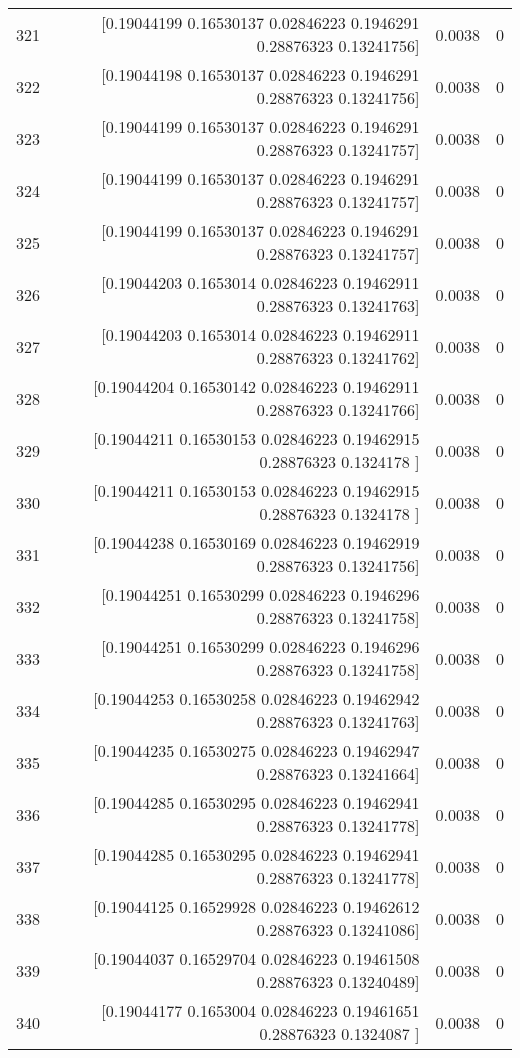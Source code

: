 \begin{longtable}{lrrr}
321 & [0.19044199 0.16530137 0.02846223 0.1946291  0.28876323 0.13241756] & 0.0038 & 0 \\
322 & [0.19044198 0.16530137 0.02846223 0.1946291  0.28876323 0.13241756] & 0.0038 & 0 \\
323 & [0.19044199 0.16530137 0.02846223 0.1946291  0.28876323 0.13241757] & 0.0038 & 0 \\
324 & [0.19044199 0.16530137 0.02846223 0.1946291  0.28876323 0.13241757] & 0.0038 & 0 \\
325 & [0.19044199 0.16530137 0.02846223 0.1946291  0.28876323 0.13241757] & 0.0038 & 0 \\
326 & [0.19044203 0.1653014  0.02846223 0.19462911 0.28876323 0.13241763] & 0.0038 & 0 \\
327 & [0.19044203 0.1653014  0.02846223 0.19462911 0.28876323 0.13241762] & 0.0038 & 0 \\
328 & [0.19044204 0.16530142 0.02846223 0.19462911 0.28876323 0.13241766] & 0.0038 & 0 \\
329 & [0.19044211 0.16530153 0.02846223 0.19462915 0.28876323 0.1324178 ] & 0.0038 & 0 \\
330 & [0.19044211 0.16530153 0.02846223 0.19462915 0.28876323 0.1324178 ] & 0.0038 & 0 \\
331 & [0.19044238 0.16530169 0.02846223 0.19462919 0.28876323 0.13241756] & 0.0038 & 0 \\
332 & [0.19044251 0.16530299 0.02846223 0.1946296  0.28876323 0.13241758] & 0.0038 & 0 \\
333 & [0.19044251 0.16530299 0.02846223 0.1946296  0.28876323 0.13241758] & 0.0038 & 0 \\
334 & [0.19044253 0.16530258 0.02846223 0.19462942 0.28876323 0.13241763] & 0.0038 & 0 \\
335 & [0.19044235 0.16530275 0.02846223 0.19462947 0.28876323 0.13241664] & 0.0038 & 0 \\
336 & [0.19044285 0.16530295 0.02846223 0.19462941 0.28876323 0.13241778] & 0.0038 & 0 \\
337 & [0.19044285 0.16530295 0.02846223 0.19462941 0.28876323 0.13241778] & 0.0038 & 0 \\
338 & [0.19044125 0.16529928 0.02846223 0.19462612 0.28876323 0.13241086] & 0.0038 & 0 \\
339 & [0.19044037 0.16529704 0.02846223 0.19461508 0.28876323 0.13240489] & 0.0038 & 0 \\
340 & [0.19044177 0.1653004  0.02846223 0.19461651 0.28876323 0.1324087 ] & 0.0038 & 0 \\

\end{longtable}
